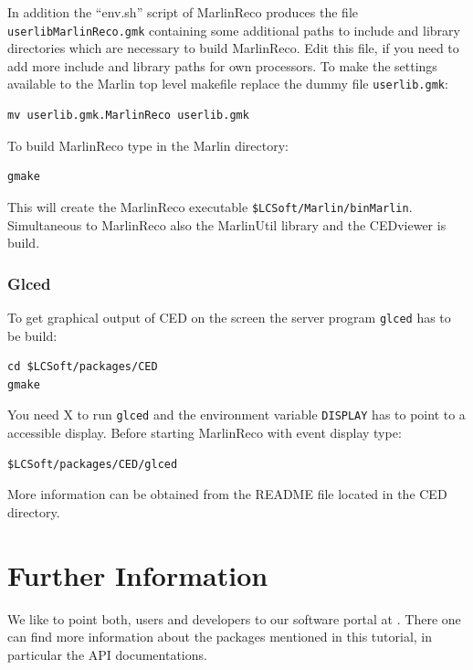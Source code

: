 In addition the ``env.sh'' script of MarlinReco produces the file 
{\tt userlibMarlinReco.gmk} containing some additional paths 
to include and library directories which are necessary to build 
MarlinReco. Edit this file, if you need to add 
more include and library paths for own processors. To make the settings 
available to the Marlin top level makefile replace the dummy file 
{\tt userlib.gmk}:

\begin{verbatim}
mv userlib.gmk.MarlinReco userlib.gmk
\end{verbatim}

To build MarlinReco type in the Marlin directory:

\begin{verbatim}
gmake
\end{verbatim}

This will create the MarlinReco executable {\tt \$LCSoft/Marlin/binMarlin}. 
Simultaneous to MarlinReco also the MarlinUtil library and the CEDviewer is 
build. 

\subsubsection*{Glced}

To get graphical output of CED on the screen the server program {\tt glced}
has to be build: 

\begin{verbatim} 
cd $LCSoft/packages/CED
gmake
\end{verbatim}

You need X to run {\tt glced} and the environment variable 
{\tt DISPLAY} has to point to a accessible display. Before starting
MarlinReco with event display type:

\begin{verbatim}
$LCSoft/packages/CED/glced
\end{verbatim}

More information can be obtained from the README file located in the 
CED directory. 

\section{Further Information}

We like to point both, users and developers to our software portal at
.
There one can find more information about the packages mentioned in this 
tutorial, in particular the API documentations. 

